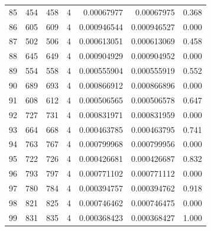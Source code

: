 \begin{tabular}{r r r r r r r}
85 & 454 & 458 & 4 & 0.00067977 & 0.00067975 & 0.368 \\
86 & 605 & 609 & 4 & 0.000946544 & 0.000946527 & 0.000 \\
87 & 502 & 506 & 4 & 0.000613051 & 0.000613069 & 0.458 \\
88 & 645 & 649 & 4 & 0.000904929 & 0.000904952 & 0.000 \\
89 & 554 & 558 & 4 & 0.000555904 & 0.000555919 & 0.552 \\
90 & 689 & 693 & 4 & 0.000866912 & 0.000866896 & 0.000 \\
91 & 608 & 612 & 4 & 0.000506565 & 0.000506578 & 0.647 \\
92 & 727 & 731 & 4 & 0.000831971 & 0.000831959 & 0.000 \\
93 & 664 & 668 & 4 & 0.000463785 & 0.000463795 & 0.741 \\
94 & 763 & 767 & 4 & 0.000799968 & 0.000799956 & 0.000 \\
95 & 722 & 726 & 4 & 0.000426681 & 0.000426687 & 0.832 \\
96 & 793 & 797 & 4 & 0.000771102 & 0.000771112 & 0.000 \\
97 & 780 & 784 & 4 & 0.000394757 & 0.000394762 & 0.918 \\
98 & 821 & 825 & 4 & 0.000746462 & 0.000746475 & 0.000 \\
99 & 831 & 835 & 4 & 0.000368423 & 0.000368427 & 1.000 \\
\bottomrule
\end{tabular}
